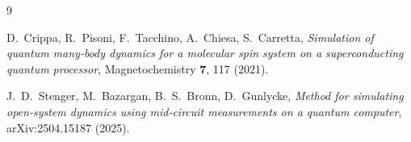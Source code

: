 \documentclass[11pt,a4paper]{article}
\begin{document}
\begin{thebibliography}{9}

D.~Crippa, R.~Pisoni, F.~Tacchino, A.~Chiesa, S.~Carretta, \emph{Simulation
of quantum many-body dynamics for a molecular spin system on a
superconducting quantum processor}, Magnetochemistry \textbf{7}, 117 (2021).

J.~D.~Stenger, M.~Bazargan, B.~S.~Bronn, D.~Gunlycke, \emph{Method for
simulating open-system dynamics using mid-circuit measurements on a
quantum computer}, arXiv:2504.15187 (2025).

\end{thebibliography}
\end{document}
